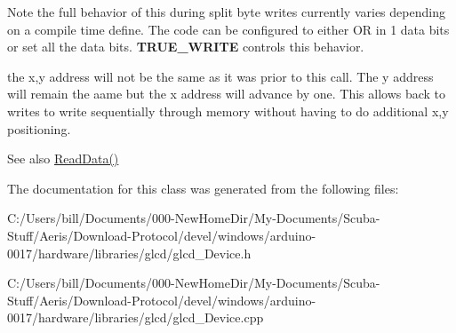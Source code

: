 \begin{DoxyNote}{Note}
the full behavior of this during split byte writes currently varies depending on a compile time define. The code can be configured to either OR in 1 data bits or set all the data bits. {\bfseries TRUE\_\-WRITE} controls this behavior.

the x,y address will not be the same as it was prior to this call. The y address will remain the aame but the x address will advance by one. This allows back to writes to write sequentially through memory without having to do additional x,y positioning.
\end{DoxyNote}
\begin{DoxySeeAlso}{See also}
\hyperlink{classglcd___device_a2ec1756ae0c7787fad676d6398c73de3}{ReadData()} 
\end{DoxySeeAlso}


The documentation for this class was generated from the following files:\begin{DoxyCompactItemize}
\item 
C:/Users/bill/Documents/000-\/NewHomeDir/My-\/Documents/Scuba-\/Stuff/Aeris/Download-\/Protocol/devel/windows/arduino-\/0017/hardware/libraries/glcd/glcd\_\-Device.h\item 
C:/Users/bill/Documents/000-\/NewHomeDir/My-\/Documents/Scuba-\/Stuff/Aeris/Download-\/Protocol/devel/windows/arduino-\/0017/hardware/libraries/glcd/glcd\_\-Device.cpp\end{DoxyCompactItemize}
